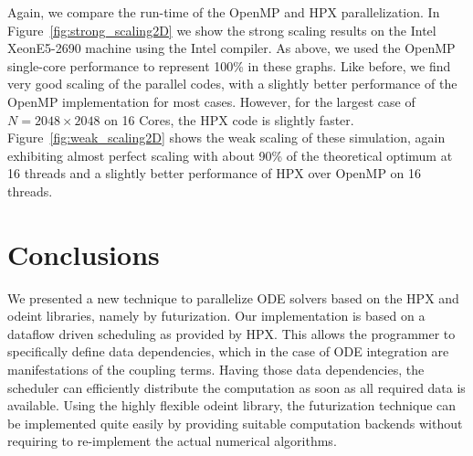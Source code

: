 \documentclass[10pt]{elsarticle}
\begin{document}
Again, we compare the run-time of the OpenMP and HPX parallelization.
In Figure~\ref{fig:strong_scaling2D} we show the strong scaling results on the Intel XeonE5-2690 machine using the Intel compiler.
As above, we used the OpenMP single-core performance to represent 100\% in these graphs.
Like before, we find very good scaling of the parallel codes, with a slightly better performance of the OpenMP implementation for most cases.
However, for the largest case of $N=2048\times2048$ on 16 Cores, the HPX code is slightly faster.
Figure~\ref{fig:weak_scaling2D} shows the weak scaling of these simulation, again exhibiting almost perfect scaling with about 90\% of the theoretical optimum at 16 threads and a slightly better performance of HPX over OpenMP on 16 threads.


\section{Conclusions} \label{sec:conc}

We presented a new technique to parallelize ODE solvers based on the HPX and odeint libraries, namely by futurization.
Our implementation is based on a dataflow driven scheduling as provided by HPX.
This allows the programmer to specifically define data dependencies, which in the case of ODE integration are manifestations of the coupling terms.
Having those data dependencies, the scheduler can efficiently distribute the computation as soon as all required data is available.
Using the highly flexible odeint library, the futurization technique can be implemented quite easily by providing suitable computation backends without requiring to re-implement the actual numerical algorithms.
\end{document}
